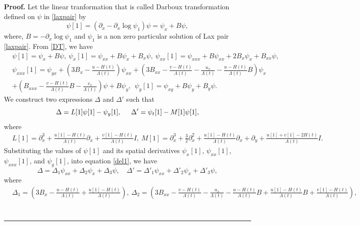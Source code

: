 \documentclass{article}%
\newenvironment{proof}[1][Proof]{\noindent\textbf{#1.} }{\ \rule{0.5em}{0.5em}}
\begin{document}
\begin{proof}
Let the linear tranformation that is called Darboux transformation defined on $\psi$ in \eqref{laxpair} by
\begin{equation}
	\psi[1]=(\partial_x-\partial_x\log\psi_1)\psi=\psi_{x}+B\psi, \label{DT}
\end{equation}
where, $B=-\partial_x\log\psi_1$ and $\psi_{1}$ is a non zero particular solution of Lax pair \eqref{laxpair}.
From \eqref{DT}, we have
\begin{equation}
\begin{split}
&\psi[1]=\psi_x+B\psi,~\psi_x[1]=\psi_{xx}+B\psi_x+B_x\psi,~\psi_{xx}[1]=\psi_{xxx}+B\psi_{xx}+2B_x\psi_x+B_{xx}\psi,\\&\psi_{xxx}[1]=\psi_{yx}+(3B_x-\frac{u-H(t)}{\Lambda(t)})\psi_{xx}+(3B_{xx}-\frac{v-H(t)}{\Lambda(t)}-\frac{u_x}{\Lambda(t)}-\frac{u-H(t)}{\Lambda(t)}B)\psi_x\\&+(B_{xxx}-\frac{v-H(t)}{\Lambda(t)}B-\frac{v_x}{\Lambda(t)})\psi+B\psi_y,~~
\psi_y[1]=\psi_{xy}+B\psi_y+B_y\psi.
\end{split}
\end{equation}
We construct two expressions $\Delta$ and $\Delta'$ such that
\begin{equation}
\Delta=L[1]\psi[1]-\psi_y[1],\hspace{5mm}\Delta'=\psi_t[1]-M[1]\psi[1],\label{del1}
\end{equation}
where 
\begin{equation}
\begin{split}
&L[1]=\partial_x^3+\frac{u[1]-H(t)}{\Lambda(t)}\partial_x+\frac{v[1]-H(t)}{\Lambda(t)}I,~ M[1]=\partial_x^3+\frac{3}{2}\partial^2_x+\frac{u[1]-H(t)}{\Lambda(t)}\partial_x+\partial_y+\frac{u[1]+v[1]-2H(t)}{\Lambda(t)}I.
\end{split}
\end{equation}
Substituting the values of $\psi[1]$ and its spatial derivatives $\psi_x[1]$,  $\psi_{xx}[1]$, $\psi_{xxx}[1]$, and $\psi_{y}[1]$, into equation \eqref{del1}, we have
\begin{equation}
\Delta=\Delta_1\psi_{xx}+\Delta_2\psi_{x}+\Delta_3\psi, \quad \Delta'=\Delta'_1\psi_{xx}+\Delta'_2\psi_{x}+\Delta'_3\psi,
\end{equation}
where
\begin{equation}
\begin{split}
&\Delta_1=(3B_x-\frac{u-H(t)}{\Lambda(t)}+\frac{u[1]-H(t)}{\Lambda(t)}),~
\Delta_2=(3B_{xx}-\frac{v-H(t)}{\Lambda(t)}-\frac{u_x}{\Lambda(t)}-\frac{u-H(t)}{\Lambda(t)}B+\frac{u[1]-H(t)}{\Lambda(t)}B+\frac{v[1]-H(t)}{\Lambda(t)}),\\

\end{split}
\end{equation}
\end{proof}
\end{document}
